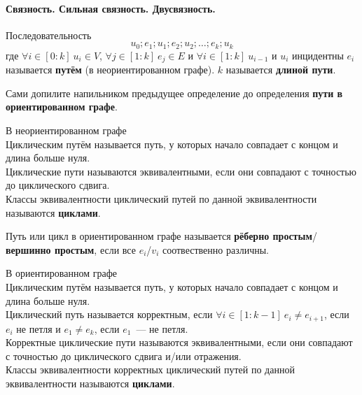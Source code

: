 \documentclass{article}
\begin{document}
    \paragraph{Связность. Сильная связность. Двусвязность.}
    \begin{definition}
        Последовательность
        $$
        u_0;e_1;u_1;e_2;u_2;\ldots;e_k;u_k
        $$
        где $\forall i\in[0:k]~u_i\in V$, $\forall j\in[1:k]~e_j\in E$ и $\forall i\in[1:k]~u_{i-1}$ и $u_i$ инцидентны $e_i$ называется \textbf{путём} (в неориентированном графе). $k$ называется \textbf{длиной пути}.
    \end{definition}
    \begin{definition}
        Сами допилите напильником предыдущее определение до определения \textbf{пути в ориентированном графе}.
    \end{definition}
    \begin{definition}
        {\large В неориентированном графе}\\
        Циклическим путём называется путь, у которых начало совпадает с концом и длина больше нуля.\\
        Циклические пути называются эквивалентными, если они совпадают с точностью до циклического сдвига.\\
        Классы эквивалентности циклический путей по данной эквивалентности называются \textbf{циклами}.
    \end{definition}
    \begin{definition}
        Путь или цикл в ориентированном графе называется \textbf{рёберно простым}/\textbf{вершинно простым}, если все $e_i$/$v_i$ соотвественно различны.
    \end{definition}
    \begin{definition}
        {\large В ориентированном графе}\\
        Циклическим путём называется путь, у которых начало совпадает с концом и длина больше нуля.\\
        Циклический путь называется корректным, если $\forall i\in[1:k-1]~e_i\neq e_{i+1}$, если $e_i$ не петля и $e_1\neq e_k$, если $e_1$~--- не петля.\\
        Корректные циклические пути называются эквивалентными, если они совпадают с точностью до циклического сдвига и/или отражения.\\
        Классы эквивалентности корректных циклический путей по данной эквивалентности называются \textbf{циклами}.
    \end{definition}
\end{document}
